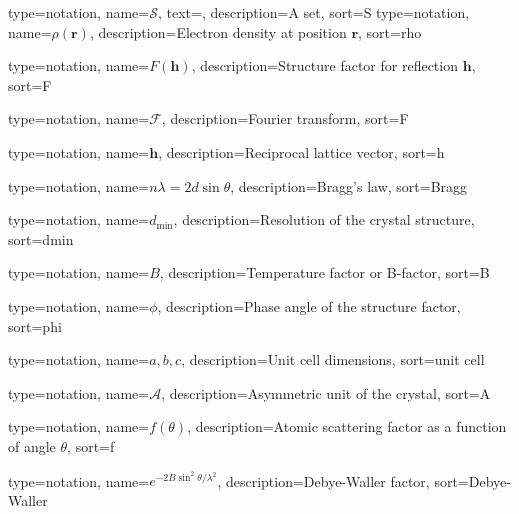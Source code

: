 {%
  type={notation},
  name={$\mathcal{S}$},
  text={},
  description={A set},
  sort={S}
}
{
  type=notation,
  name={\ensuremath{\rho(\mathbf{r})}},
  description={Electron density at position \ensuremath{\mathbf{r}}},
  sort={rho}
}

{
  type=notation,
  name={\ensuremath{F(\mathbf{h})}},
  description={Structure factor for reflection \ensuremath{\mathbf{h}}},
  sort={F}
}

{
  type=notation,
  name={\ensuremath{\mathcal{F}}},
  description={Fourier transform},
  sort={F}
}

{
  type=notation,
  name={\ensuremath{\mathbf{h}}},
  description={Reciprocal lattice vector},
  sort={h}
}

{
  type=notation,
  name={\ensuremath{n\lambda = 2d\sin\theta}},
  description={Bragg's law},
  sort={Bragg}
}

{
  type=notation,
  name={\ensuremath{d_{\text{min}}}},
  description={Resolution of the crystal structure},
  sort={dmin}
}

{
  type=notation,
  name={\ensuremath{B}},
  description={Temperature factor or B-factor},
  sort={B}
}

{
  type=notation,
  name={\ensuremath{\phi}},
  description={Phase angle of the structure factor},
  sort={phi}
}

{
  type=notation,
  name={\ensuremath{a, b, c}},
  description={Unit cell dimensions},
  sort={unit cell}
}

{
  type=notation,
  name={\ensuremath{\mathcal{A}}},
  description={Asymmetric unit of the crystal},
  sort={A}
}

{
  type=notation,
  name={\ensuremath{f(\theta)}},
  description={Atomic scattering factor as a function of angle \ensuremath{\theta}},
  sort={f}
}

{
  type=notation,
  name={\ensuremath{e^{-2B\sin^2\theta/\lambda^2}}},
  description={Debye-Waller factor},
  sort={Debye-Waller}
}

